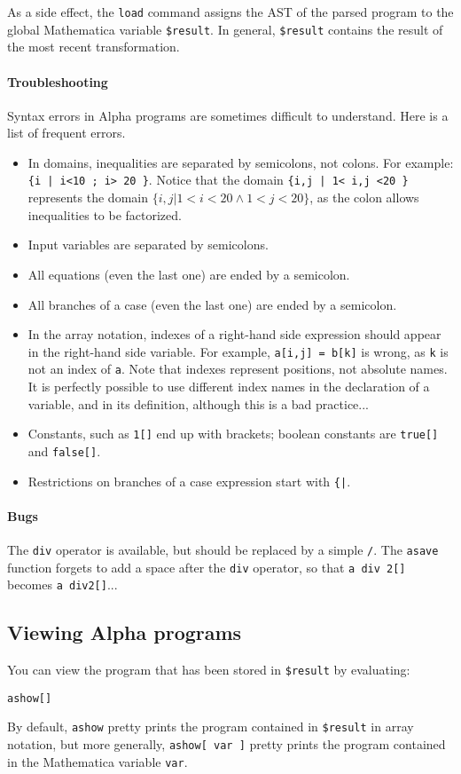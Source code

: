 \documentclass[12pt]{article}
\newcommand{\Alpha}{{\sc Alpha}}
\newcommand{\alfa}{\Alpha}
\newcommand{\mma}{{Mathematica}}
\begin{document}
As a side effect, the \texttt{load} command assigns the AST of
the parsed program to 
the global \mma{} variable {\tt \$result}. 
In general, 
\texttt{\$result} contains the result of the most recent transformation.

\paragraph*{Troubleshooting}
Syntax errors in \alfa{} programs are sometimes difficult to understand. Here is 
a list of frequent errors.
\begin{itemize}
\item In domains, inequalities are separated by semicolons, not
colons. For example: \texttt{\{i | i<10 ; i> 20 \}}. Notice
that the domain \texttt{\{i,j | 1< i,j <20 \}}
represents the domain $\{i,j | 1 < i < 20 \wedge 
1 < j < 20 \}$, as the colon allows inequalities to 
be factorized.
\item Input variables are separated by semicolons.
\item All equations (even the last one) are ended by a semicolon.
\item All branches of a case (even the last one) are ended by a semicolon.
\item In the array notation, 
indexes of a right-hand side expression should appear in 
the right-hand side variable. For
example, \texttt{a[i,j] = b[k]} is wrong, as \texttt{k} is
not an index of \texttt{a}. Note that indexes represent 
positions, not absolute names. It is perfectly possible 
to use different index names in the declaration of a
variable, and in its definition, although this is a
bad practice...
\item Constants, such as \texttt{1[]} end up with brackets; boolean
constants are \texttt{true[]} and \texttt{false[]}.
\item Restrictions on branches of a case expression start with
\texttt{\{|}. 
\end{itemize}

\paragraph*{Bugs}
The \texttt{div} operator is available, but should be
replaced by a simple \texttt{/}. The \texttt{asave} function 
forgets to add a space after the \texttt{div} operator, so that
\texttt{a div 2[]} becomes \texttt{a div2[]}...

\subsection{Viewing {\Alpha} programs}
You can view the program that has been stored in {\tt \$result} by 
evaluating:
\begin{verbatim}
ashow[]
\end{verbatim}
By default, \texttt{ashow} pretty prints the program contained 
in {\tt \$result} in array notation, but more generally, \texttt{ashow[ var ]}
pretty prints the program contained in the \mma{} variable \texttt{var}.
\end{document}
